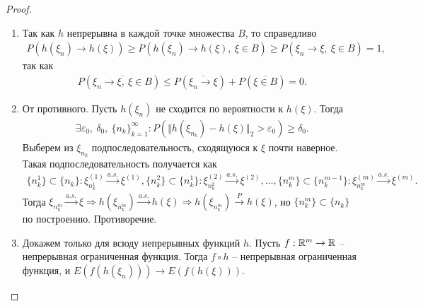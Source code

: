\begin{proof} ~
	\begin{enumerate}
		\item Так как $h$ непрерывна в каждой точке множества $B$, то справедливо 
		\begin{gather*}
		    P\left(h\left(\xi_n\right) \rightarrow h\left(\xi\right)\right) \ge P\left(h\left(\xi_n\right) \rightarrow h\left(\xi\right),\ \xi \in B\right) \ge P\left(\xi_n \rightarrow \xi,\ \xi \in B\right) = 1,
		\end{gather*}
		так как
		\begin{gather*}
		    P\left(\overline{\xi_n \rightarrow \xi,\ \xi \in B}\right) \le P\left(\overline{\xi_n \rightarrow \xi}\right) + P\left(\overline{\xi \in B}\right) = 0.
		\end{gather*}
		
		\item От противного. Пусть $h\left(\xi_n\right)$ не сходится по вероятности к $h\left(\xi\right)$. Тогда
		\begin{gather*}
		    \exists \varepsilon_0,\ \delta_0,\ \{n_k\}_{k=1}^\infty : P(\Vert h(\xi_{n_k}) - h(\xi)\Vert_2 > \varepsilon_0) \ge \delta_0.
		\end{gather*}
		Выберем из $\xi_{n_k}$ подпоследовательность, сходящуюся к $\xi$ почти наверное. Такая подпоследовательность получается как
		\begin{gather*}
		    \{n_k^1\} \subset \{n_k\}: \xi^{(1)}_{n_k^1} \xrightarrow{a.s.} \xi^{(1)}, \{n_k^2\} \subset \{n_k^1\}: \xi^{(2)}_{n_k^2}\xrightarrow{a.s.} \xi^{(2)},\ldots, \{n_k^m\} \subset \{n_k^{m-1}\}: \xi^{(m)}_{n_k^m}\xrightarrow{a.s.} \xi^{(m)}.
		\end{gather*}
		Тогда $\xi_{n_k^m} \xrightarrow{a.s.} \xi \Rightarrow h(\xi_{n_k^m}) \xrightarrow{a.s.} h(\xi) \Rightarrow h(\xi_{n_k^m}) \xrightarrow{P} h(\xi)$, но $\{n_k^m\} \subset \{n_k\}$ по построению. Противоречие.
		
		\item Докажем только для всюду непрерывных функций $h$. Пусть $f:\mathbb{R}^m\rightarrow\mathbb{R}$ -- непрерывная ограниченная функция. Тогда $f \circ h$ -- непрерывная ограниченная функция, и $E\left(f\left(h\left(\xi_n\right)\right)\right) \rightarrow E\left(f \left( h\left( \xi\right) \right) \right).$
	\end{enumerate}
\end{proof}